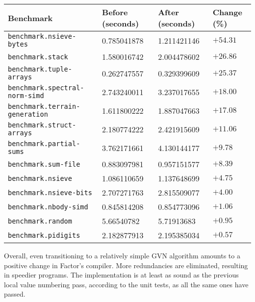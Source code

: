 \begin{longtable}{llll}
\toprule
Benchmark & Before (seconds) & After (seconds) & Change (\%) \\
\midrule
\endhead
\texttt{benchmark.nsieve-bytes}             & 0.785041878       & 1.211421146         & $+54.31$    \\
\texttt{benchmark.stack}                    & 1.580016742       & 2.004478602         & $+26.86$    \\
\texttt{benchmark.tuple-arrays}             & 0.262747557       & 0.329399609         & $+25.37$    \\
\texttt{benchmark.spectral-norm-simd}       & 2.743240011       & 3.237017655         & $+18.00$    \\
\texttt{benchmark.terrain-generation}       & 1.611800222       & 1.887047663         & $+17.08$    \\
\texttt{benchmark.struct-arrays}            & 2.180774222       & 2.421915609         & $+11.06$    \\
\texttt{benchmark.partial-sums}             & 3.762171661       & 4.130144177         & $+9.78$     \\
\texttt{benchmark.sum-file}                 & 0.883097981       & 0.957151577         & $+8.39$     \\
\texttt{benchmark.nsieve}                   & 1.086110659       & 1.137648699         & $+4.75$     \\
\texttt{benchmark.nsieve-bits}              & 2.707271763       & 2.815509077         & $+4.00$     \\
\texttt{benchmark.nbody-simd}               & 0.845814208       & 0.854773096         & $+1.06$     \\
\texttt{benchmark.random}                   & 5.66540782        & 5.71913683          & $+0.95$     \\
\texttt{benchmark.pidigits}                 & 2.182877913       & 2.195385034         & $+0.57$     \\
\end{longtable}

Overall, even transitioning to a relatively simple \gls{GVN} algorithm amounts
to a positive change in Factor's compiler.  More redundancies are eliminated,
resulting in speedier programs.  The implementation is at least as sound as the
previous local value numbering pass, according to the unit tests, as all the
same ones have passed.
